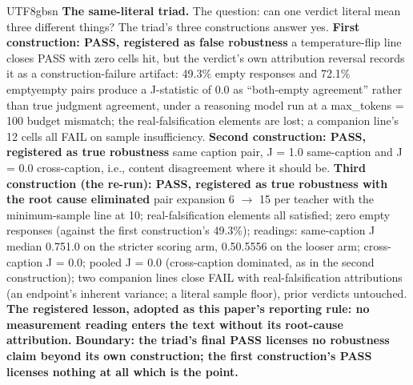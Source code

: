 \documentclass[11pt,letterpaper]{article}
\begin{document}
\begin{CJK}{UTF8}{gbsn}
\textbf{The same-literal triad.} The question: can one verdict literal mean three different things? The triad's three constructions answer yes. \textbf{First construction: PASS, registered as false robustness} \textemdash{} a temperature-flip line closes PASS with zero cells hit, but the verdict's own attribution reversal records it as a construction-failure artifact: 49.3\% empty responses and 72.1\% empty\textendash{}empty pairs produce a J-statistic of 0.0 as ``both-empty agreement'' rather than true judgment agreement, under a reasoning model run at a max\_tokens = 100 budget mismatch; the real-falsification elements  are lost; a companion line's 12 cells all FAIL on sample insufficiency. \textbf{Second construction: PASS, registered as true robustness} \textemdash{} same caption pair, J = 1.0 same-caption and J = 0.0 cross-caption, i.e., content disagreement where it should be. \textbf{Third construction (the re-run): PASS, registered as true robustness with the root cause eliminated} \textemdash{} pair expansion 6 \ensuremath{\to} 15 per teacher with the minimum-sample line at 10; real-falsification elements  all satisfied; zero empty responses (against the first construction's 49.3\%); readings: same-caption J median 0.75\textendash{}1.0 on the stricter scoring arm, 0.5\textendash{}0.5556 on the looser arm; cross-caption J = 0.0; pooled J = 0.0 (cross-caption dominated, as in the second construction); two companion lines close FAIL with real-falsification attributions (an endpoint's inherent variance; a literal sample floor), prior verdicts untouched. \textbf{The registered lesson, adopted as this paper's reporting rule: no measurement reading enters the text without its root-cause attribution.} \textbf{Boundary: the triad's final PASS licenses no robustness claim beyond its own construction; the first construction's PASS licenses nothing at all \textemdash{} which is the point.}


\end{CJK}
\end{document}
